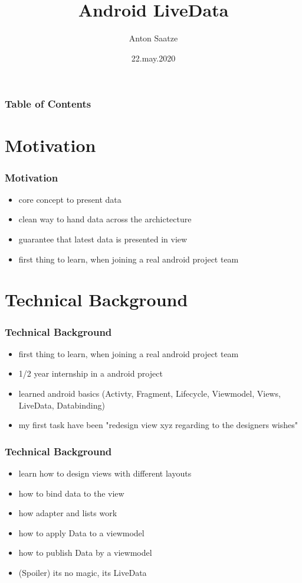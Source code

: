 \documentclass{beamer}
\author{Anton Saatze}
\title{Android LiveData}
\institute{University of applied Sciences Munich}
\date{22.may.2020}
\begin{document}
	\maketitle
	
	\begin{frame}
		\frametitle{Table of Contents}
		\tableofcontents
	\end{frame}
	
	\section[Motivation]{Motivation}
	\begin{frame}
		\frametitle{Motivation}
		\begin{itemize}
		\item core concept to present data
		\item clean way to hand data across the archictecture
		\item guarantee that latest data is presented in view
		\item first thing to learn, when joining a real android project team
		\end{itemize}
	\end{frame}
	
	\section[Technical Background]{Technical Background}
	\begin{frame}
		\frametitle{Technical Background}
		\begin{itemize}
		\item first thing to learn, when joining a real android project team
		\item 1/2 year internship in a android project
		\item learned android basics (Activty, Fragment, Lifecycle, Viewmodel, Views, LiveData, Databinding)
		\item my first task have been "redesign view xyz regarding to the designers wishes"
		\end{itemize}
		\end{frame}
		\begin{frame}
		\frametitle{Technical Background}
		\begin{itemize}
		\item learn how to design views with different layouts
		\item how to bind data to the view
		\item how adapter and lists work
		\item how to apply Data to a viewmodel
		\item how to publish Data by a viewmodel
		\item (Spoiler) its no magic, its LiveData
		\end{itemize}
	\end{frame}
	
\end{document}
